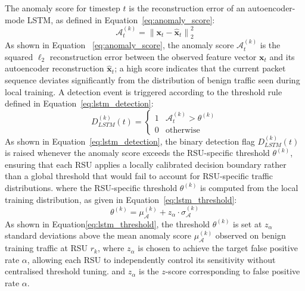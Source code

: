 \documentclass[12pt, a4paper]{report}
\begin{document}
The anomaly score for timestep $t$ is the reconstruction error of an
autoencoder-mode LSTM,
as defined in Equation~\eqref{eq:anomaly_score}:
\begin{equation}
\mathcal{A}_t^{(k)} =
\left\|\mathbf{x}_t - \hat{\mathbf{x}}_t\right\|_2^2
\label{eq:anomaly_score}
\end{equation}
As shown in Equation ~\eqref{eq:anomaly_score}, the anomaly
score $\mathcal{A}_t^{(k)}$ is the squared $\ell_2$ reconstruction
error between the observed feature vector $\mathbf{x}_t$ and its
autoencoder reconstruction $\hat{\mathbf{x}}_t$; a high score
indicates that the current packet sequence deviates significantly
from the distribution of benign traffic seen during local training.
A detection event is triggered
according to the threshold rule defined in
Equation~\eqref{eq:lstm_detection}:
\begin{equation}
D_{LSTM}^{(k)}(t) =
\begin{cases}
1 & \mathcal{A}_t^{(k)} > \theta^{(k)} \\
0 & \text{otherwise}
\end{cases}
\label{eq:lstm_detection}
\end{equation}
As shown in Equation~\eqref{eq:lstm_detection}, the binary
detection flag $D_{LSTM}^{(k)}(t)$ is raised whenever the anomaly
score exceeds the RSU-specific threshold $\theta^{(k)}$, ensuring
that each RSU applies a locally calibrated decision boundary rather
than a global threshold that would fail to account for
RSU-specific traffic distributions.
where the RSU-specific threshold $\theta^{(k)}$ is computed from the
local training distribution,
as given in Equation~\eqref{eq:lstm_threshold}:
\begin{equation}
\theta^{(k)} = \mu_{\mathcal{A}}^{(k)} + z_\alpha \cdot \sigma_{\mathcal{A}}^{(k)}
\label{eq:lstm_threshold}
\end{equation}
As shown in Equation\eqref{eq:lstm_threshold}, the threshold
$\theta^{(k)}$ is set at $z_\alpha$ standard deviations above the
mean anomaly score $\mu_{\mathcal{A}}^{(k)}$ observed on benign
training traffic at RSU $r_k$, where $z_\alpha$ is chosen to achieve
the target false positive rate $\alpha$, allowing each RSU to
independently control its sensitivity without centralised threshold
tuning.
and $z_\alpha$ is the $z$-score corresponding to false positive rate
$\alpha$.
\end{document}
